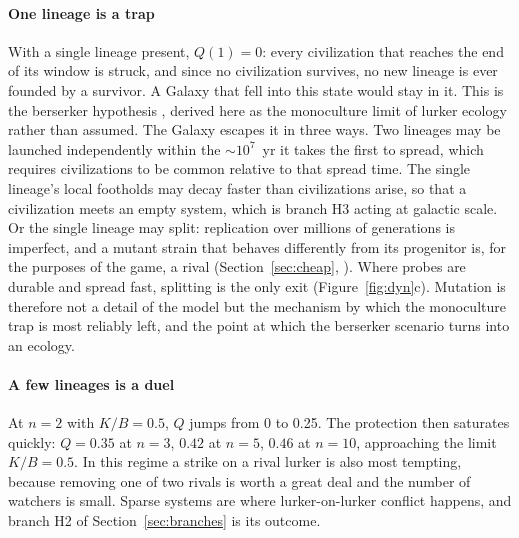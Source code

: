 \documentclass[preprint,12pt]{elsarticle}
\theoremstyle{definition}
\begin{document}
\paragraph{One lineage is a trap}
With a single lineage present, $Q(1) = 0$: every civilization that reaches the end of its window is struck, and since no civilization survives, no new lineage is ever founded by a survivor. A Galaxy that fell into this state would stay in it. This is the berserker hypothesis \citep{Brin1983}, derived here as the monoculture limit of lurker ecology rather than assumed. The Galaxy escapes it in three ways. Two lineages may be launched independently within the $\sim 10^{7}$~yr it takes the first to spread, which requires civilizations to be common relative to that spread time. The single lineage's local footholds may decay faster than civilizations arise, so that a civilization meets an empty system, which is branch H3 acting at galactic scale. Or the single lineage may split: replication over millions of generations is imperfect, and a mutant strain that behaves differently from its progenitor is, for the purposes of the game, a rival (Section~\ref{sec:cheap}, \citep{Chen2022}). Where probes are durable and spread fast, splitting is the only exit (Figure~\ref{fig:dyn}c). Mutation is therefore not a detail of the model but the mechanism by which the monoculture trap is most reliably left, and the point at which the berserker scenario turns into an ecology.

\paragraph{A few lineages is a duel}
At $n = 2$ with $K/B = 0.5$, $Q$ jumps from 0 to 0.25. The protection then saturates quickly: $Q = 0.35$ at $n = 3$, $0.42$ at $n = 5$, $0.46$ at $n = 10$, approaching the limit $K/B = 0.5$. In this regime a strike on a rival lurker is also most tempting, because removing one of two rivals is worth a great deal and the number of watchers is small. Sparse systems are where lurker-on-lurker conflict happens, and branch H2 of Section~\ref{sec:branches} is its outcome.
\end{document}
